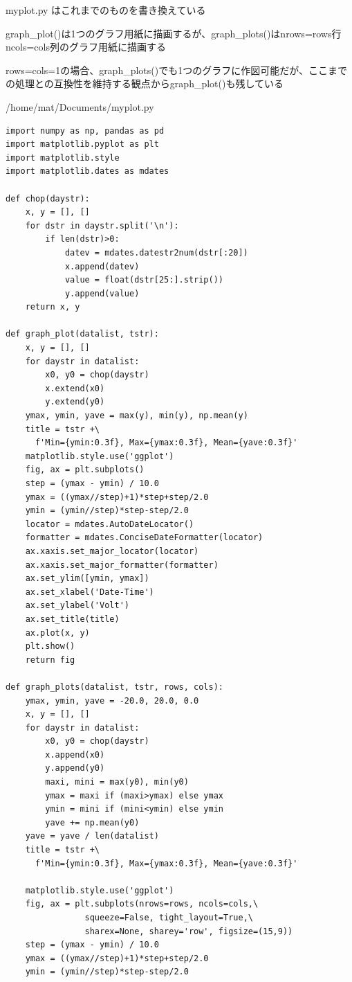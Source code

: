 \documentclass[12pt,a4j]{jsbook}
\begin{document}
myplot.py はこれまでのものを書き換えている

graph\_plot()は1つのグラフ用紙に描画するが、graph\_plots()はnrows=rows行ncols=cols列のグラフ用紙に描画する

rows=cols=1の場合、graph\_plots()でも1つのグラフに作図可能だが、ここまでの処理との互換性を維持する観点からgraph\_plot()も残している\\

\begin{spacing}{0.8}
\begin{breakbox}[l]{/home/mat/Documents/myplot.py}
\begin{verbatim}
import numpy as np, pandas as pd
import matplotlib.pyplot as plt
import matplotlib.style
import matplotlib.dates as mdates

def chop(daystr):
    x, y = [], []
    for dstr in daystr.split('\n'):
        if len(dstr)>0:
            datev = mdates.datestr2num(dstr[:20])
            x.append(datev)
            value = float(dstr[25:].strip())
            y.append(value)
    return x, y

def graph_plot(datalist, tstr):
    x, y = [], []
    for daystr in datalist:
        x0, y0 = chop(daystr)
        x.extend(x0)
        y.extend(y0)
    ymax, ymin, yave = max(y), min(y), np.mean(y)
    title = tstr +\
      f'Min={ymin:0.3f}, Max={ymax:0.3f}, Mean={yave:0.3f}'
    matplotlib.style.use('ggplot')
    fig, ax = plt.subplots()
    step = (ymax - ymin) / 10.0
    ymax = ((ymax//step)+1)*step+step/2.0
    ymin = (ymin//step)*step-step/2.0
    locator = mdates.AutoDateLocator()
    formatter = mdates.ConciseDateFormatter(locator)
    ax.xaxis.set_major_locator(locator)
    ax.xaxis.set_major_formatter(formatter)
    ax.set_ylim([ymin, ymax])
    ax.set_xlabel('Date-Time')
    ax.set_ylabel('Volt')
    ax.set_title(title)
    ax.plot(x, y)
    plt.show()
    return fig

def graph_plots(datalist, tstr, rows, cols):
    ymax, ymin, yave = -20.0, 20.0, 0.0
    x, y = [], []
    for daystr in datalist:
        x0, y0 = chop(daystr)
        x.append(x0)
        y.append(y0)
        maxi, mini = max(y0), min(y0)
        ymax = maxi if (maxi>ymax) else ymax
        ymin = mini if (mini<ymin) else ymin
        yave += np.mean(y0)
    yave = yave / len(datalist)
    title = tstr +\
      f'Min={ymin:0.3f}, Max={ymax:0.3f}, Mean={yave:0.3f}'

    matplotlib.style.use('ggplot')
    fig, ax = plt.subplots(nrows=rows, ncols=cols,\
                squeeze=False, tight_layout=True,\
                sharex=None, sharey='row', figsize=(15,9))
    step = (ymax - ymin) / 10.0
    ymax = ((ymax//step)+1)*step+step/2.0
    ymin = (ymin//step)*step-step/2.0


\end{verbatim}
\end{breakbox}
\end{spacing}
\end{document}
